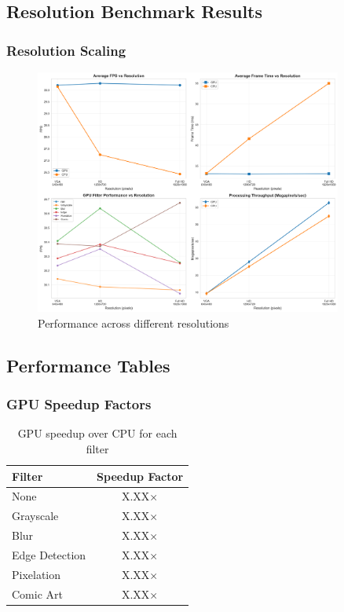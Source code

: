 \documentclass[12pt,a4paper]{article}
\begin{document}

\subsection{Resolution Benchmark Results}

\subsubsection{Resolution Scaling}
\begin{figure}[H]
    \centering
    \includegraphics[width=0.9\textwidth]{../data/plots/resolution_impact.png}
    \caption{Performance across different resolutions}
    \label{fig:resolution_impact}
\end{figure}


\subsection{Performance Tables}

\subsubsection{GPU Speedup Factors}
\begin{table}[H]
    \centering
    \caption{GPU speedup over CPU for each filter}
    \label{tab:speedup}
    \begin{tabular}{lc}
        \toprule
        Filter & Speedup Factor \\
        \midrule
        None & X.XX× \\
        Grayscale & X.XX× \\
        Blur & X.XX× \\
        Edge Detection & X.XX× \\
        Pixelation & X.XX× \\
        Comic Art & X.XX× \\
        \bottomrule
    \end{tabular}
\end{table}
\end{document}
